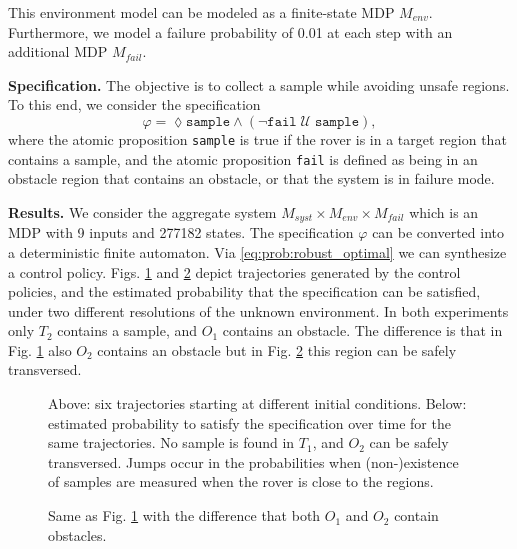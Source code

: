 This environment model can be modeled as a finite-state MDP $M_{env}$. Furthermore, we model a failure probability of 0.01 at each step with an additional MDP $M_{fail}$.

\textbf{Specification.} The objective is to collect a sample while avoiding unsafe regions. To this end, we consider the specification
\begin{equation}
	\varphi = \lozenge \texttt{sample} \land \left( \lnot \texttt{fail} \; \mathcal {U} \; \texttt{sample} \right),
\end{equation}
where the atomic proposition \texttt{sample} is true if the rover is in a target region that contains a sample, and the atomic proposition \texttt{fail} is defined as being in an obstacle region that contains an obstacle, or that the system is in failure mode.

\textbf{Results.} We consider the aggregate system $M_{syst} \times M_{env} \times M_{fail}$ which is an MDP with 9 inputs and 277182 states. The specification $\varphi$ can be converted into a deterministic finite automaton. Via \eqref{eq:prob:robust_optimal} we can synthesize a control policy. Figs. \ref{fig:exp1} and \ref{fig:exp2} depict trajectories generated by the control policies, and the estimated probability that the specification can be satisfied, under two different resolutions of the unknown environment. In both experiments only $T_2$ contains a sample, and $O_1$ contains an obstacle. The difference is that in Fig. \ref{fig:exp1} also $O_2$ contains an obstacle but in Fig. \ref{fig:exp2} this region can be safely transversed.

\begin{figure}
	\footnotesize
	\setlength\figurewidth{\columnwidth} 
	\setlength{} 

	
	\setlength{} 

	
	\caption{Above: six trajectories starting at different initial conditions. Below: estimated probability to satisfy the specification over time for the same trajectories. No sample is found in $T_1$, and $O_2$ can be safely transversed. Jumps occur in the probabilities when (non-)existence of samples are measured when the rover is close to the regions.}
	\label{fig:exp1}
\end{figure}

\begin{figure}
	\footnotesize
	\setlength\figurewidth{\columnwidth} 
	\setlength{} 

	

	\setlength{} 

	
	\caption{Same as Fig. \ref{fig:exp1} with the difference that both $O_1$ and $O_2$ contain obstacles.}
	\label{fig:exp2}
\end{figure}